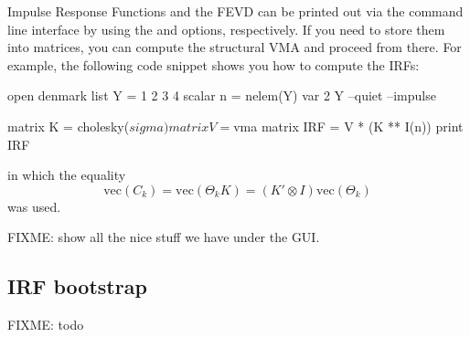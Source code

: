 Impulse Response Functions and the FEVD can be printed out via the
command line interface by using the  and
 options, respectively. If you need to store
them into matrices, you can compute the structural VMA and proceed
from there. For example, the following code snippet shows you how to
compute the IRFs:
\begin{code}
open denmark
list Y = 1 2 3 4
scalar n = nelem(Y)
var 2 Y --quiet --impulse

matrix K = cholesky($sigma)
matrix V = $vma
matrix IRF = V * (K ** I(n))
print IRF
\end{code}
in which the equality
\[
\mathrm{vec}(C_k) = \mathrm{vec}(\Theta_k K) = (K' \otimes I)
\mathrm{vec} (\Theta_k)
\]
was used.

FIXME: show all the nice stuff we have under the GUI.

\subsection{IRF bootstrap}

FIXME: todo 


